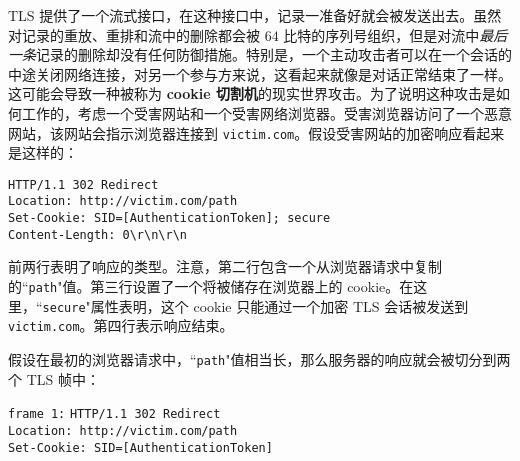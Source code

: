 \begin{snote}
TLS 提供了一个流式接口，在这种接口中，记录一准备好就会被发送出去。虽然对记录的重放、重排和流中的删除都会被 $64$ 比特的序列号组织，但是对流中\emph{最后一条}记录的删除却没有任何防御措施。特别是，一个主动攻击者可以在一个会话的中途关闭网络连接，对另一个参与方来说，这看起来就像是对话正常结束了一样。这可能会导致一种被称为 \textbf{cookie 切割机}的现实世界攻击。为了说明这种攻击是如何工作的，考虑一个受害网站和一个受害网络浏览器。受害浏览器访问了一个恶意网站，该网站会指示浏览器连接到 \texttt{victim.com}。假设受害网站的加密响应看起来是这样的：

\vspace*{10pt}

\hspace*{29pt} \texttt{HTTP/1.1 302 Redirect}\\
\hspace*{50pt} \texttt{Location: http://victim.com/path}\\
\hspace*{50pt} \texttt{Set-Cookie: SID=[AuthenticationToken]; secure}\\
\hspace*{50pt} \texttt{Content-Length: 0\;\;\;\textbackslash r\textbackslash n\textbackslash r\textbackslash n}
         
\vspace*{10pt}
        
\noindent
前两行表明了响应的类型。注意，第二行包含一个从浏览器请求中复制的``\texttt{path}"值。第三行设置了一个将被储存在浏览器上的 cookie。在这里，``\texttt{secure}"属性表明，这个 cookie 只能通过一个加密 TLS 会话被发送到 \texttt{victim.com}。第四行表示响应结束。

假设在最初的浏览器请求中，``\texttt{path}"值相当长，那么服务器的响应就会被切分到两个 TLS 帧中：

\vspace*{10pt}

\hspace*{1pt} \texttt{frame 1:}
\hspace*{10.5pt} \texttt{HTTP/1.1 302 Redirect}\\
\hspace*{85pt} \texttt{Location: http://victim.com/path}\\
\hspace*{85pt} \texttt{Set-Cookie: SID=[AuthenticationToken]}
         
\vspace*{10pt}


\end{snote}
